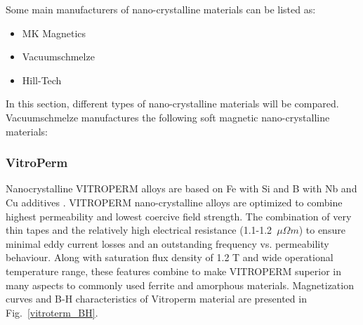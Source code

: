 \documentclass[a4paper, 11pt]{article} %
\begin{document}
Some main manufacturers of nano-crystalline materials can be listed as:

\begin{itemize}
  \item MK Magnetics
  \item Vacuumschmelze
  \item Hill-Tech
\end{itemize}

In this section, different types of nano-crystalline materials will be compared. 
Vacuumschmelze manufactures the following soft magnetic nano-crystalline materials:


\subsubsection*{VitroPerm}


Nanocrystalline VITROPERM alloys are based on Fe with Si and B with Nb and Cu additives \cite{vitroterm_manual}. VITROPERM nano-crystalline alloys are optimized to combine highest permeability and lowest coercive field strength. The combination of very thin tapes and the relatively high electrical resistance (1.1-1.2~$\mu \Omega m$) to ensure minimal eddy current losses and an outstanding frequency vs. permeability behaviour. Along with saturation flux density of 1.2 T and wide operational temperature range, these features combine to make VITROPERM  superior in many aspects to commonly used ferrite and amorphous materials. Magnetization curves and B-H characteristics of Vitroperm material are presented in Fig.~\ref{vitroterm_BH}.
\end{document}
